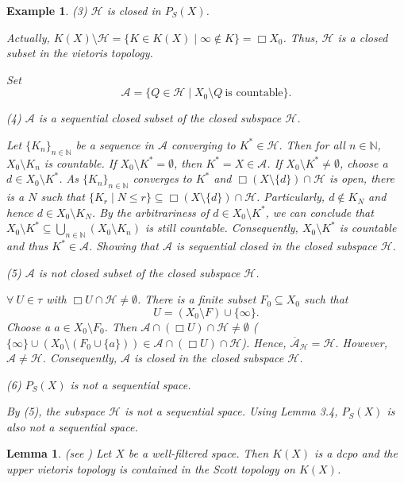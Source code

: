 \documentclass[preprint,12pt]{elsarticle}
\numberwithin{equation}{section}
\newtheorem{lemma}[theorem]{Lemma}
\newtheorem{example}[theorem]{Example}
\begin{document}
\begin{example}
{(3) $\mathcal{H}$ is closed in $P_{S}(X)$.

Actually, $K(X)\setminus\mathcal{H}=\{K\in K(X)\mid\infty\not\in K\}=\Box X_{0}$. Thus, $\mathcal{H}$ is a closed subset in the vietoris topology.

Set $$\mathcal{A}=\{Q\in\mathcal{H}\mid X_{0}\setminus Q\ \mbox{is countable}\}.$$

(4) $\mathcal{A}$ is a sequential closed subset of the closed subspace $\mathcal{H}$.

Let $\{K_{n}\}_{n\in\mathbb{N}}$ be a sequence in $\mathcal{A}$ converging to $K^{\ast}\in\mathcal{H}$. Then for all $n\in\mathbb{N}$, $X_{0}\setminus K_{n}$ is countable. If $X_{0}\setminus K^{\ast}=\emptyset$, then $K^{\ast}=X\in\mathcal{A}$. If $X_{0}\setminus K^{\ast}\neq\emptyset$, choose a $d\in X_{0}\setminus K^{\ast}$. As $\{K_{n}\}_{n\in\mathbb{N}}$ converges to $K^{\ast}$ and $\Box(X\setminus\{d\})\cap\mathcal{H}$ is open, there is a $N$ such that $\{K_{r}\mid N\leq r\}\subseteq\Box(X\setminus\{d\})\cap\mathcal{H}$. Particularly, $d\not\in K_{N}$ and hence $d\in X_{0}\setminus K_{N}$. By the arbitrariness of $d\in X_{0}\setminus K^{\ast}$, we can conclude that $X_{0}\setminus K^{\ast}\subseteq\bigcup\limits_{n\in\mathbb{N}}(X_{0}\setminus K_{n})$ is still countable. Consequently, $X_{0}\setminus K^{\ast}$ is countable and thus $K^{\ast}\in\mathcal{A}$. Showing that $\mathcal{A}$ is sequential closed in the closed subspace $\mathcal{H}$.

(5) $\mathcal{A}$ is not closed subset of the closed subspace $\mathcal{H}$.

$\forall\ U\in\tau$ with $\Box U\cap\mathcal{H}\neq\emptyset$. There is a finite subset $F_{0}\subseteq X_{0}$ such that $$U=(X_{0}\setminus F)\cup\{\infty\}.$$
Choose a $a\in X_{0}\setminus F_{0}$. Then $\mathcal{A}\cap(\Box U)\cap\mathcal{H}\neq\emptyset$ ($\{\infty\}\cup(X_{0}\setminus(F_{0}\cup\{a\}))\in\mathcal{A}\cap(\Box U)\cap\mathcal{H}$). Hence, $\overline{\mathcal{A}}_{\mathcal{H}}=\mathcal{H}$. However, $\mathcal{A}\neq\mathcal{H}$. Consequently, $\mathcal{A}$ is closed in the closed subspace $\mathcal{H}$.

(6) $P_{S}(X)$ is not a sequential space.

By (5), the subspace $\mathcal{H}$ is not a sequential space. Using Lemma 3.4, $P_{S}(X)$ is also not a sequential space.

}
\end{example}


\begin{lemma} {\rm (see \cite{GG03}) Let $X$ be a well-filtered space. Then $K(X)$ is a dcpo and the upper vietoris topology is contained in the Scott topology on $K(X)$.}
\end{lemma}
\end{document}
